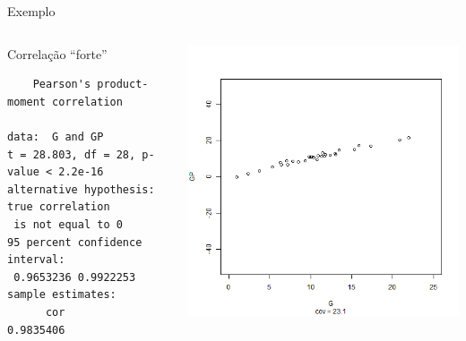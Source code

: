 \documentclass{beamer}
\begin{document}
\begin{frame}[fragile]{\scriptsize Exemplo}
  \begin{columns}
    \begin{column}{6cm}
      \begin{exampleblock}{Correlação ``forte''}
        \tiny
\begin{verbatim}
	Pearson's product-moment correlation

data:  G and GP
t = 28.803, df = 28, p-value < 2.2e-16
alternative hypothesis: true correlation
 is not equal to 0
95 percent confidence interval:
 0.9653236 0.9922253
sample estimates:
      cor 
0.9835406
\end{verbatim}
    \end{exampleblock}
   \end{column}
    \begin{column}{4cm}
  \begin{center}
    \includegraphics[height=.8\textheight]{Cap17/anim-1}
  \end{center}
    \end{column}
\end{columns}
\end{frame}
\end{document}
